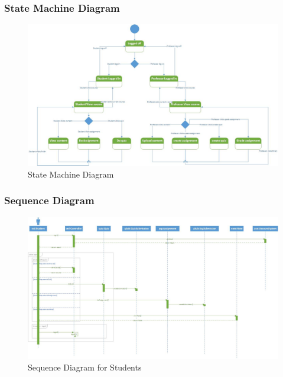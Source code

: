 \documentclass{beamer}
\begin{document}
\begin{frame}
	\frametitle{State Machine Diagram}
	\begin{figure}[!ht]
		\begin{center}
			\includegraphics[width=\textwidth,height=0.7\textheight,keepaspectratio]{state}
		\end{center}
		\caption{State Machine Diagram}
	\end{figure}
\end{frame}

\begin{frame}
	\frametitle{Sequence Diagram}
	\begin{figure}[!ht]
		\begin{center}
			\includegraphics[width=\textwidth,height=\textheight,keepaspectratio]{studSeq}
		\end{center}
		\caption{Sequence Diagram for Students}
	\end{figure}
\end{frame}
\end{document}
